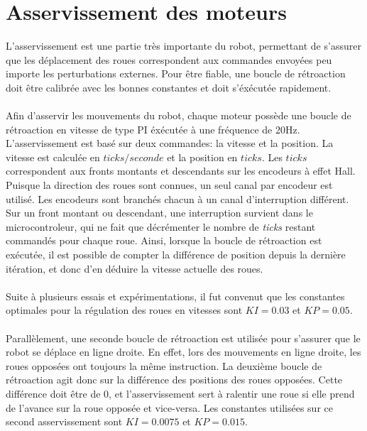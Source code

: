 \section{Asservissement des moteurs}

L'asservissement est une partie très importante du robot, permettant de s'assurer que les déplacement des roues correspondent aux commandes envoyées peu importe les perturbations externes. Pour être fiable, une boucle de rétroaction doit être calibrée avec les bonnes constantes et doit s'éxécutée rapidement.
\paragraph{}
Afin d'asservir les mouvements du robot, chaque moteur possède une boucle de rétroaction en vitesse de type PI éxécutée à une fréquence de 20Hz. L'asservissement est basé sur deux commandes: la vitesse et la position. La vitesse est calculée en $ticks/seconde$ et la position en $ticks$. Les $ticks$ correspondent aux fronts montants et descendants sur les encodeurs à effet Hall. Puisque la direction des roues sont connues, un seul canal par encodeur est utilisé. Les encodeurs sont branchés chacun à un canal d'interruption différent. Sur un front montant ou descendant, une interruption survient dans le microcontroleur, qui ne fait que décrémenter le nombre de \textit{ticks} restant commandés pour chaque roue. Ainsi, lorsque la boucle de rétroaction est exécutée, il est possible de compter la différence de position depuis la dernière itération, et donc d'en déduire la vitesse actuelle des roues. 
\paragraph{}
Suite à plusieurs essais et expérimentations, il fut convenut que les constantes optimales pour la régulation des roues en vitesses sont $KI = 0.03$ et $KP = 0.05$. 
\paragraph{}
Parallèlement, une seconde boucle de rétroaction est utilisée pour s'assurer que le robot se déplace en ligne droite. En effet, lors des mouvements en ligne droite, les roues opposées ont toujours la même instruction. La deuxième boucle de rétroaction agit donc sur la différence des positions des roues opposées. Cette différence doit être de 0, et l'asservissement sert à ralentir une roue si elle prend de l'avance sur la roue opposée et vice-versa. Les constantes utilisées sur ce second asservissement sont $KI = 0.0075$ et $KP = 0.015$.